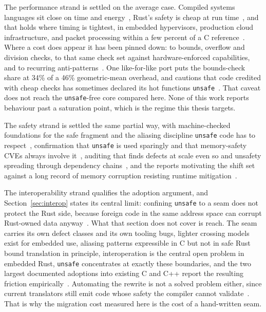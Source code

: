 \documentclass[english,oneside,a4paper,censored,csm,software-track-2020]{HYthesisML}
\begin{document}
The performance strand is settled on the average case. Compiled systems languages sit close on
time and energy~\cite{bugden2022rust,pereira2017energy}, Rust's safety is cheap at run
time~\cite{balasubramanian2017rust,levy2017kernel}, and that holds where timing is tightest, in
embedded hypervisors, production cloud infrastructure, and packet processing within a few percent
of a C reference~\cite{mo2023rustshyper,agache2020firecracker,emmerich2019drivers,xiao2024rpkt}.
Where a cost does appear it has been pinned down: to bounds, overflow and division checks, to that
same check set against hardware-enforced capabilities, and to recurring
anti-patterns~\cite{zhang2022runtime,harris2023morello,cui2025perfbugs}. One like-for-like port
puts the bounds-check share at 34\% of a 46\% geometric-mean overhead, and cautions that code
credited with cheap checks has sometimes declared its hot functions
\texttt{unsafe}~\cite{naylor2026cherisimt}. That caveat does not reach the \texttt{unsafe}-free
core compared here. None of this work reports behaviour past a saturation point, which is the
regime this thesis targets.

The safety strand is settled the same partial way, with machine-checked foundations for the safe
fragment and the aliasing discipline \texttt{unsafe} code has to
respect~\cite{jung2018rustbelt,jung2021safe,jung2020stacked}, confirmation that \texttt{unsafe} is
used sparingly and that memory-safety CVEs always involve
it~\cite{qin2020rust,astrauskas2020unsafe,xu2021rustcve}, auditing that finds defects at scale even
so and unsafety spreading through dependency
chains~\cite{bae2021rudra,zheng2024security,qin2024safety,evans2020rust}, and the reports
motivating the shift set against a long record of memory corruption resisting runtime
mitigation~\cite{msrc2019memory,google2022android,google2024securebydesign,cisa2023memorysafe,oncd2024building,szekeres2013sok}.

The interoperability strand qualifies the adoption argument, and Section~\ref{sec:interop} states
its central limit: confining \texttt{unsafe} to a seam does not protect the Rust side, because
foreign code in the same address space can corrupt Rust-owned data
anyway~\cite{rivera2021galeed,kirth2022pkrusafe}. What that section does not cover is reach. The
seam carries its own defect classes and its own tooling bugs, lighter crossing models exist for
embedded use, aliasing patterns expressible in C but not in safe Rust bound translation in
principle, interoperation is the central open problem in embedded Rust, \texttt{unsafe}
concentrates at exactly these boundaries, and the two largest documented adoptions into existing C
and C++ report the resulting friction
empirically~\cite{li2022crosslang,cai2026interop,schuermann2023encapsulated,emre2023aliasing,sharma2024embedded,mccormack2026unsafe,li2026rustlinux,fan2026android}.
Automating the rewrite is not a solved problem either, since current translators still emit code
whose safety the compiler cannot validate~\cite{hong2025ctorust}. That is why the migration cost
measured here is the cost of a hand-written seam.
\end{document}
